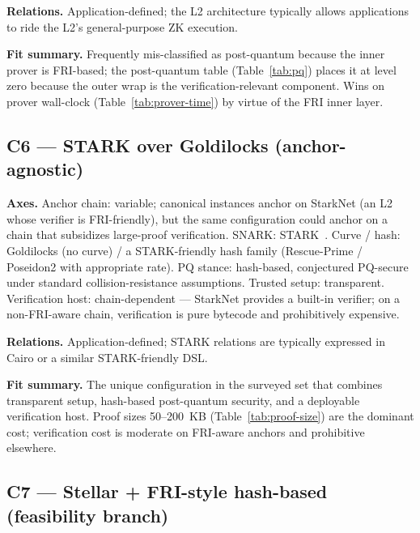 \textbf{Relations.} Application-defined; the L2 architecture
typically allows applications to ride the L2's general-purpose ZK
execution.

\textbf{Fit summary.} Frequently mis-classified as post-quantum
because the inner prover is FRI-based; the post-quantum table
(Table~\ref{tab:pq}) places it at level zero because the outer wrap
is the verification-relevant component. Wins on prover wall-clock
(Table~\ref{tab:prover-time}) by virtue of the FRI inner layer.

\subsection{C6 --- STARK over Goldilocks (anchor-agnostic)}
\label{sec:cfg-c6}

\textbf{Axes.} Anchor chain: variable; canonical instances anchor on
StarkNet (an L2 whose verifier is FRI-friendly), but the same
configuration could anchor on a chain that subsidizes large-proof
verification. SNARK: STARK~\cite{ben-sasson-2018-stark}.
Curve / hash: Goldilocks (no curve) / a STARK-friendly hash family
(Rescue-Prime / Poseidon2 with appropriate rate). PQ stance:
hash-based, conjectured PQ-secure under standard collision-resistance
assumptions. Trusted setup: transparent. Verification host:
chain-dependent --- StarkNet provides a built-in verifier; on a
non-FRI-aware chain, verification is pure bytecode and prohibitively
expensive.

\textbf{Relations.} Application-defined; STARK relations are
typically expressed in Cairo or a similar STARK-friendly DSL.

\textbf{Fit summary.} The unique configuration in the surveyed set
that combines transparent setup, hash-based post-quantum security,
and a deployable verification host. Proof sizes 50--200~KB
(Table~\ref{tab:proof-size}) are the dominant cost; verification
cost is moderate on FRI-aware anchors and prohibitive elsewhere.

\subsection{C7 --- Stellar + FRI-style hash-based (feasibility branch)}
\label{sec:cfg-c7}

